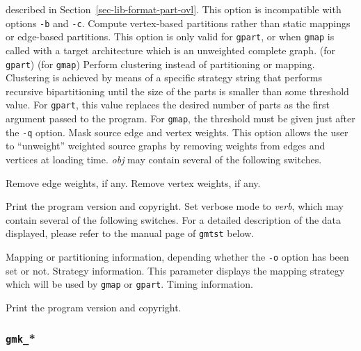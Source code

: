 \begin{itemize}
\begin{itemize}
described in Section~\ref{sec-lib-format-part-ovl}.
This option is incompatible with options \texttt{-b} and
\texttt{-c}.
\iteme[\texttt{-o}]
Compute vertex-based partitions rather than static mappings or
edge-based partitions. This option is only valid for \texttt{gpart}, or
when \texttt{gmap} is called with a target architecture which is an
unweighted complete graph.
\iteme[\texttt{-q}] (for \texttt{gpart})
 (for \texttt{gmap})
Perform clustering instead of partitioning or mapping. Clustering is
achieved by means of a specific strategy string that performs
recursive bipartitioning until the size of the parts is smaller than
some threshold value. For \texttt{gpart}, this value replaces the desired
number of parts as the first argument passed to the program. For
\texttt{gmap}, the threshold must be given just after the \texttt{-q} option.
Mask source edge and vertex weights. This option allows the user to
``unweight'' weighted source graphs by removing weights from edges and
vertices at loading time. {\it obj\/} may contain several of the following
switches.
\begin{itemize}
\iteme[\texttt{e}]
Remove edge weights, if any.
\iteme[\texttt{v}]
Remove vertex weights, if any.
\end{itemize}
\iteme[\texttt{-V}]
Print the program version and copyright.
Set verbose mode to {\it verb}, which may contain several of the following
switches. For a detailed description of the data displayed, please
refer to the manual page of \texttt{gmtst} below.
\begin{itemize}
\iteme[\texttt{m}]
Mapping or partitioning information, depending whether the \texttt{-o}
option has been set or not.
\iteme[\texttt{s}]
Strategy information. This parameter displays the mapping
strategy which will be used by \texttt{gmap} or \texttt{gpart}.
\iteme[\texttt{t}]
Timing information.
\end{itemize}
\iteme[\texttt{-V}]
Print the program version and copyright.
\end{itemize}
\end{itemize}

\subsubsection{\texttt{gmk\_}*}

